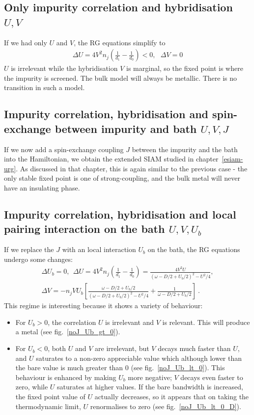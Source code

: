 \subsection{Only impurity correlation and hybridisation \(U,V\)}
If we had only \(U\) and \(V\), the RG equations simplify to
\begin{equation}\begin{aligned}
	\Delta U = 4V^2 n_j\left(\frac{1}{d_1} - \frac{1}{d_0}\right) < 0,~ ~ ~\Delta V = 0
\end{aligned}\end{equation}
\(U\) is irrelevant while the hybridisation \(V\) is marginal, so the fixed point is where the impurity is screened. The bulk model will always be metallic. There is no transition in such a model.

\subsection{Impurity correlation, hybridisation and spin-exchange between impurity and bath \(U,V,J\)}
If we now add a spin-exchange coupling \(J\) between the impurity and the bath into the Hamiltonian, we obtain the extended SIAM studied in chapter~\ref{esiam-urg}. As discussed in that chapter, this is again similar to the previous case - the only stable fixed point is one of strong-coupling, and the bulk metal will never have an insulating phase.

\subsection{Impurity correlation, hybridisation and local pairing interaction on the bath \(U,V,U_b\)}
If we replace the \(J\) with an local interaction \(U_b\) on the bath, the RG equations undergo some changes:
\begin{gather}
	\Delta U_b = 0, ~ ~\Delta U = 4V^2 n_j\left(\frac{1}{d_1} - \frac{1}{d_0}\right) = \frac{4V^2U}{\left(\omega - D/2 + U_b/2\right)^2 - U^2/4},\\
	\Delta V = -n_j V U_b\left[\frac{\omega - D/2 + U_b/2}{\left(\omega - D/2 + U_b/2\right)^2 - U^2/4} + \frac{1}{\omega - D/2 + U_b/2}\right]~.
\end{gather}
This regime is interesting because it shows a variety of behaviour:
\begin{itemize}
	\item For \(U_b>0\), the correlation \(U\) is irrelevant and \(V\) is relevant. This will produce a metal (see fig.~\ref{noJ_Ub_gt_0}).
	\item For \(U_b<0\), both \(U\) and \(V\) are irrelevant, but \(V\) decays much faster than \(U\), and \(U\) saturates to a non-zero appreciable value which although lower than the bare value is much greater than 0 (see fig.~\ref{noJ_Ub_lt_0}). This behaviour is enhanced by making \(U_b\) more negative; \(V\) decays even faster to zero, while \(U\) saturates at higher values. If the bare bandwidth is increased, the fixed point value of \(U\) actually decreases, so it appears that on taking the thermodynamic limit, \(U\) renormalises to zero (see fig.~\ref{noJ_Ub_lt_0_D}).
\end{itemize}

